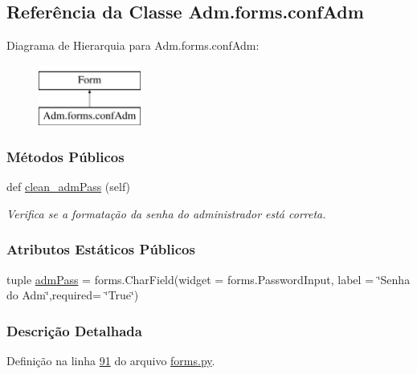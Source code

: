 \hypertarget{classAdm_1_1forms_1_1confAdm}{}\subsection{Referência da Classe Adm.\+forms.\+conf\+Adm}
\label{classAdm_1_1forms_1_1confAdm}
Diagrama de Hierarquia para Adm.\+forms.\+conf\+Adm\+:\begin{figure}[H]
\begin{center}
\leavevmode
\includegraphics[height=2.000000cm]{d2/db2/classAdm_1_1forms_1_1confAdm}
\end{center}
\end{figure}
\subsubsection*{Métodos Públicos}
\begin{DoxyCompactItemize}
\item 
def \hyperlink{classAdm_1_1forms_1_1confAdm_adb8ab8c61b8bc45b32c975d54f5b9ae0}{clean\+\_\+adm\+Pass} (self)
\begin{DoxyCompactList}\small\item\em Verifica se a formatação da senha do administrador está correta. \end{DoxyCompactList}\end{DoxyCompactItemize}
\subsubsection*{Atributos Estáticos Públicos}
\begin{DoxyCompactItemize}
\item 
tuple \hyperlink{classAdm_1_1forms_1_1confAdm_a30fc9256d1b7a6ca4ac453111c6944b9}{adm\+Pass} = forms.\+Char\+Field(widget = forms.\+Password\+Input, label = \char`\"{}Senha do Adm\char`\"{},required= \char`\"{}True\char`\"{})
\end{DoxyCompactItemize}


\subsubsection{Descrição Detalhada}


Definição na linha \hyperlink{Adm_2forms_8py_source_l00091}{91} do arquivo \hyperlink{Adm_2forms_8py_source}{forms.\+py}.



